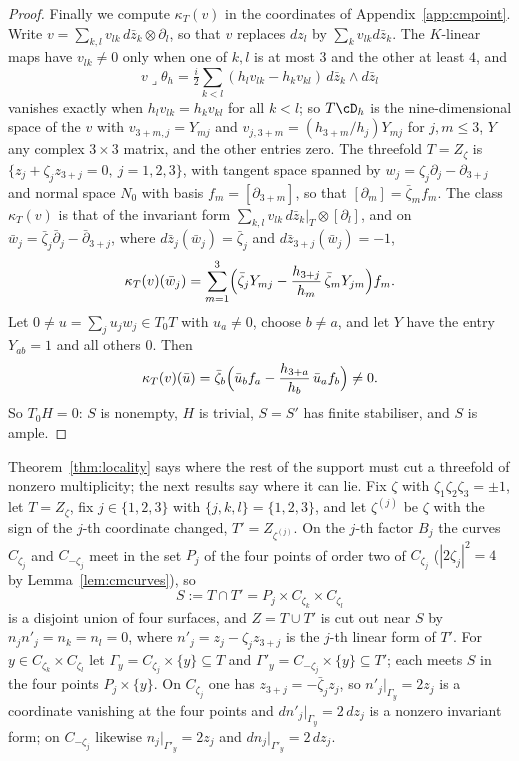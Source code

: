 \begin{proof}
Finally we compute $\kappa_{T}(v)$ in the coordinates of Appendix~\ref{app:cmpoint}. Write $v=\sum_{k,l}v_{lk}\,d\bar z_{k}\otimes\partial_{l}$, so that $v$ replaces $dz_{l}$ by $\sum_{k}v_{lk}d\bar z_{k}$. The $K$-linear maps have $v_{lk}\ne0$ only when one of $k,l$ is at most $3$ and the other at least $4$, and
\[
v\lrcorner\theta_{h}=\tfrac{i}{2}\sum_{k<l}(h_{l}v_{lk}-h_{k}v_{kl})\,d\bar z_{k}\wedge d\bar z_{l}
\]
vanishes exactly when $h_{l}v_{lk}=h_{k}v_{kl}$ for all $k<l$; so $T\cD_{h}$ is the nine-dimensional space of the $v$ with $v_{3+m,j}=Y_{mj}$ and $v_{j,3+m}=(h_{3+m}/h_{j})Y_{mj}$ for $j,m\le3$, $Y$ any complex $3\times3$ matrix, and the other entries zero. The threefold $T=Z_{\zeta}$ is $\{z_{j}+\zeta_{j}z_{3+j}=0,\ j=1,2,3\}$, with tangent space spanned by $w_{j}=\zeta_{j}\partial_{j}-\partial_{3+j}$ and normal space $N_{0}$ with basis $f_{m}=[\partial_{3+m}]$, so that $[\partial_{m}]=\bar\zeta_{m}f_{m}$. The class $\kappa_{T}(v)$ is that of the invariant form $\sum_{k,l}v_{lk}\,d\bar z_{k}|_{T}\otimes[\partial_{l}]$, and on $\bar w_{j}=\bar\zeta_{j}\bar\partial_{j}-\bar\partial_{3+j}$, where $d\bar z_{j}(\bar w_{j})=\bar\zeta_{j}$ and $d\bar z_{3+j}(\bar w_{j})=-1$,
\[
\kappa_{T}(v)(\bar w_{j})=\sum_{m=1}^{3}\Bigl(\bar\zeta_{j}Y_{mj}-\frac{h_{3+j}}{h_{m}}\,\bar\zeta_{m}Y_{jm}\Bigr)f_{m}.
\]
Let $0\ne u=\sum_{j}u_{j}w_{j}\in T_{0}T$ with $u_{a}\ne0$, choose $b\ne a$, and let $Y$ have the entry $Y_{ab}=1$ and all others $0$. Then
\[
\kappa_{T}(v)(\bar u)=\bar\zeta_{b}\Bigl(\bar u_{b}f_{a}-\frac{h_{3+a}}{h_{b}}\,\bar u_{a}f_{b}\Bigr)\ne0 .
\]
So $T_{0}H=0$: $S$ is nonempty, $H$ is trivial, $S=S'$ has finite stabiliser, and $S$ is ample.
\end{proof}

Theorem~\ref{thm:locality} says where the rest of the support must cut a threefold of nonzero multiplicity; the next results say where it can lie. Fix $\zeta$ with $\zeta_{1}\zeta_{2}\zeta_{3}=\pm1$, let $T=Z_{\zeta}$, fix $j\in\{1,2,3\}$ with $\{j,k,l\}=\{1,2,3\}$, and let $\zeta^{(j)}$ be $\zeta$ with the sign of the $j$-th coordinate changed, $T'=Z_{\zeta^{(j)}}$. On the $j$-th factor $B_{j}$ the curves $C_{\zeta_{j}}$ and $C_{-\zeta_{j}}$ meet in the set $P_{j}$ of the four points of order two of $C_{\zeta_{j}}$ ($|2\zeta_{j}|^{2}=4$ by Lemma~\ref{lem:cmcurves}), so
\[
S:=T\cap T'=P_{j}\times C_{\zeta_{k}}\times C_{\zeta_{l}}
\]
is a disjoint union of four surfaces, and $Z=T\cup T'$ is cut out near $S$ by $n_{j}n'_{j}=n_{k}=n_{l}=0$, where $n'_{j}=z_{j}-\zeta_{j}z_{3+j}$ is the $j$-th linear form of $T'$. For $y\in C_{\zeta_{k}}\times C_{\zeta_{l}}$ let $\Gamma_{y}=C_{\zeta_{j}}\times\{y\}\subseteq T$ and $\Gamma'_{y}=C_{-\zeta_{j}}\times\{y\}\subseteq T'$; each meets $S$ in the four points $P_{j}\times\{y\}$. On $C_{\zeta_{j}}$ one has $z_{3+j}=-\bar\zeta_{j}z_{j}$, so $n'_{j}|_{\Gamma_{y}}=2z_{j}$ is a coordinate vanishing at the four points and $dn'_{j}|_{\Gamma_{y}}=2\,dz_{j}$ is a nonzero invariant form; on $C_{-\zeta_{j}}$ likewise $n_{j}|_{\Gamma'_{y}}=2z_{j}$ and $dn_{j}|_{\Gamma'_{y}}=2\,dz_{j}$.

